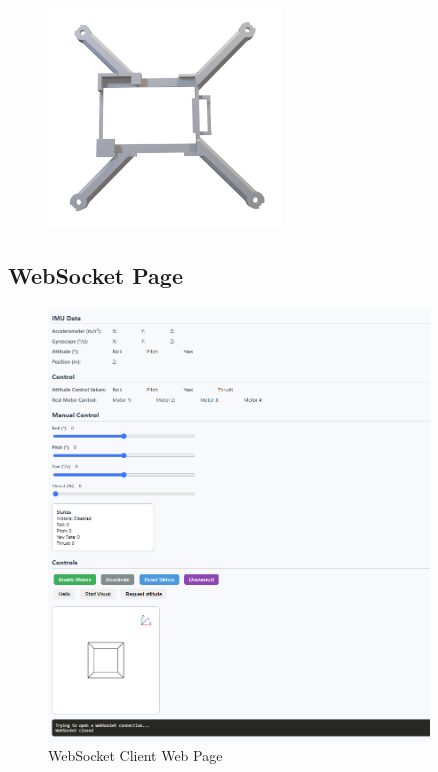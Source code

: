 \begin{figure}[H]
    \centering
    \captionsetup{justification=centering, margin=1cm}
    \includegraphics[width=0.55\textwidth]{img/OldFrame.png}
\end{figure}

\subsection{WebSocket Page}
\label{app:websocket}

\begin{figure}[H]
    \centering
    \captionsetup{justification=centering, margin=1cm}
    \includegraphics[width=0.9\textwidth]{img/websocket-page.PNG}
    \caption{WebSocket Client Web Page}
\end{figure}

